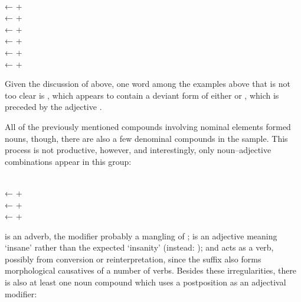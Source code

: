 \pex
	\a {} \\
		← 
		+ 
	\a {} \\
		← 
		+ 
	\a {} \\
		← 
		+ 
	\a {} \\
		← 
		+ 
	\a {} \\
		← 
		+ 
	\a {} \\
		← 
		+ \ques{}\,
\xe

Given the discussion of  above, one word among the examples
above that is not too clear is , which appears to
contain a deviant form of either  or
, which is preceded by the adjective 
.

All of the previously mentioned compounds involving nominal elements formed 
nouns, though, there are also a few denominal compounds in the sample. This 
process is not productive, however, and interestingly, only noun–adjective 
combinations appear in this group:

\pex
	\a {} \\
		← 
		+ \ques{}\,
	\a {} \\
		← 
		+ 
	\a {} \\
		← 
		+ 
\xe

 is an adverb, the modifier probably a mangling of 
;  is an adjective meaning `insane' 
rather than the expected `insanity' (instead: );
and  acts as a verb, possibly from conversion or
reinterpretation, since the suffix  also forms morphological
causatives of a number of verbs. Besides these irregularities, there is also at
least one noun compound which uses a postposition as an adjectival modifier:

